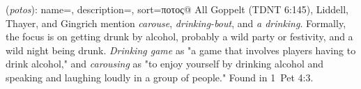 \item[Carouse,]

(\textit{potos}):
{
    name=,
    description={},
    sort=ποτος@
}
All Goppelt (TDNT 6:145), Liddell, Thayer, and Gingrich mention \emph{carouse}, \emph{drinking-bout}, and \emph{a drinking}. Formally, the focus is on getting drunk by alcohol, probably a wild party or festivity, and a wild night being drunk. \emph{Drinking game} as "a game that involves players having to drink alcohol," and \emph{carousing} as "to enjoy yourself by drinking alcohol and speaking and laughing loudly in a group of people."
Found in 1~Pet 4:3.
